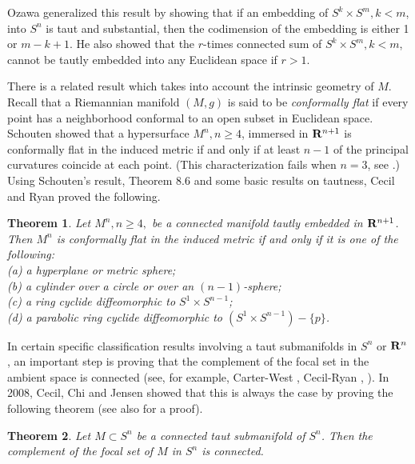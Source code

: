 \documentclass[12pt]{article}
\newtheorem{theorem}{Theorem}[section]
\begin{document}
{Ozawa \cite{Oz} generalized this result by showing that
if an embedding of $S^k \times S^m, k < m$, into $S^n$
is taut and substantial, then the codimension of the embedding
is either 1 or $m-k+1$. He also showed that the $r$-times
connected sum of $S^k \times S^m, k < m$, cannot be
tautly embedded into any Euclidean space if $r>1$. 



There is a related result which takes into account the
intrinsic geometry of $M$.  Recall that a Riemannian manifold
$(M,g)$ is said to be {\em conformally flat} if every point
has a neighborhood conformal to an open subset in Euclidean
space.  Schouten \cite{Sch} showed that a hypersurface
$M^n, n \geq 4$, 
immersed in ${\bf R}^{n+1}$ is conformally flat in the
induced metric if and only if at least $n-1$ of the principal
curvatures coincide at each point. (This characterization
fails when $n=3$, see \cite{Lan}.)  Using Schouten's
result, Theorem 8.6 and some basic results on tautness,
Cecil and Ryan \cite{CRCan} proved the following.
\begin{theorem}
\label{thm:C-R-conformally-flat}
Let $M^n, n \geq 4,$ be a connected manifold tautly embedded in ${\bf R}^{n+1}$.
Then $M^n$ is conformally flat in the induced metric if and
only if it is one of the following:\\
{\rm (a)} a hyperplane or metric sphere;\\
{\rm (b)} a cylinder over a circle or over an $(n-1)$-sphere;\\
{\rm (c)} a ring cyclide diffeomorphic to $S^1 \times S^{n-1}$;\\
{\rm (d)} a parabolic ring cyclide diffeomorphic to $(S^1 \times S^{n-1}) - \{p\}$.
\end{theorem}


In certain specific 
classification results involving a taut submanifolds in $S^n$ or ${\bf R}^n$, an important step is proving that 
the complement of the focal set in the ambient space is connected (see, for example, Carter-West \cite{CW1}, Cecil-Ryan \cite{CRMA}, \cite[pp. 336--338]{CR8}).  In 2008, Cecil, Chi and Jensen \cite[p. 237]{CCJ3} showed that this is always the case by proving the following theorem (see also \cite[pp. 339--340]{CR8} for a proof).

\begin{theorem}
\label{thm:CR-8.11}
Let $M \subset S^n$ be a connected taut submanifold of $S^n$. Then the complement of the focal set of $M$ in $S^n$ is connected.
\end{theorem}

}
\end{document}
